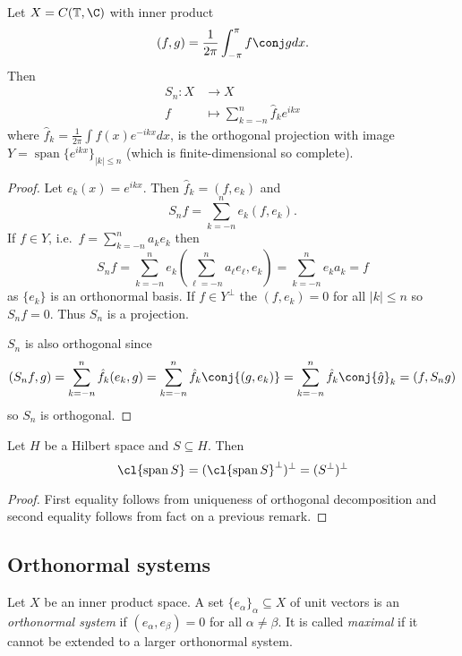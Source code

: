 \documentclass[a4paper]{article}
\DeclareMathOperator{\spans}{span} %
\begin{document}
\begin{eg}
  Let \(X = C(\mathbb T, \C)\) with inner product
  \[
    (f, g) = \frac{1}{2\pi} \int_{-\pi}^\pi f \conj g dx.
  \]
  Then
  \begin{align*}
    S_n: X &\to X \\
    f &\mapsto \sum_{k = -n}^n \hat f_k e^{ikx}
  \end{align*}
  where \(\hat f_k = \frac{1}{2\pi} \int f(x) e^{-ikx} dx\), is the orthogonal projection with image \(Y = \spans \{e^{ikx}\}_{|k| \leq n}\) (which is finite-dimensional so complete).

  \begin{proof}
    Let \(e_k(x) = e^{ikx}\). Then \(\hat f_k = (f, e_k)\) and
    \[
      S_nf = \sum_{k = -n}^n e_k (f, e_k).
    \]
    If \(f \in Y\), i.e.\ \(f = \sum_{k = -n}^n a_ke_k\) then
    \[
      S_nf
      = \sum_{k = -n}^n e_k \left( \sum_{\ell = -n}^n a_\ell e_\ell, e_k \right)
      = \sum_{k = -n}^n e_k a_k
      = f
    \]
    as \(\{e_k\}\) is an orthonormal basis. If \(f \in Y^\perp\) the \((f, e_k) = 0\) for all \(|k| \leq n\) so \(S_nf = 0\). Thus \(S_n\) is a projection.

    \(S_n\) is also orthogonal since
    \[
      (S_nf, g) = \sum_{k = -n}^n \hat f_k (e_k, g)
      = \sum_{k = -n}^n \hat f_k \conj{(g, e_k)}
      = \sum_{k = -n}^n \hat f_k \conj{\hat g}_k
      = (f, S_ng)
    \]
    so \(S_n\) is orthogonal.
  \end{proof}
\end{eg}

\begin{corollary}
  Let \(H\) be a Hilbert space and \(S \subseteq H\). Then
  \[
    \cl{\spans S}
    = (\cl{\spans S}^\perp)^\perp
    = (S^\perp)^\perp
  \]
\end{corollary}

\begin{proof}
  First equality follows from uniqueness of orthogonal decomposition and second equality follows from fact on a previous remark. %
\end{proof}

\subsection{Orthonormal systems}

\begin{definition}
  Let \(X\) be an inner product space. A set \(\{e_\alpha\}_\alpha \subseteq X\) of unit vectors is an \emph{orthonormal system} if \((e_\alpha, e_\beta) = 0\) for all \(\alpha \neq \beta\). It is called \emph{maximal} if it cannot be extended to a larger orthonormal system.
\end{definition}
\end{document}
